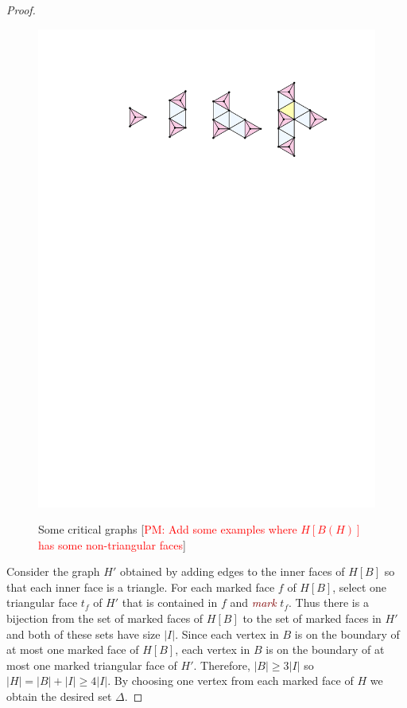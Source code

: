 \documentclass[12pt]{article}
\newcommand{\defin}[1]{\emph{\textcolor{Maroon}{#1}}}
\newcommand{\pat}[1]{[\textcolor{red}{PM: #1}]}
\begin{document}
\begin{proof}
    \begin{figure}
        \begin{center}
            \includegraphics[page=1]{figs/critical} \\
        \end{center}
        \caption{Some critical graphs \pat{Add some examples where $H[B(H)]$ has some non-triangular faces}}
        \label{critical_fig}
    \end{figure}

  Consider the graph $H'$ obtained by adding edges to the inner faces of $H[B]$ so that each inner face is a triangle. For each marked face $f$ of $H[B]$, select one triangular face $t_f$ of $H'$ that is contained in $f$ and \defin{mark} $t_f$. Thus there is a bijection from the set of marked faces of $H[B]$ to the set of marked faces in $H'$ and both of these sets have size $|I|$.  Since each vertex in $B$ is on the boundary of at most one marked face of $H[B]$, each vertex in $B$ is on the boundary of at most one marked triangular face of $H'$.  Therefore, $|B| \ge 3|I|$ so $|H|=|B|+|I|\ge 4|I|$. By choosing one vertex from each marked face of $H$ we obtain the desired set $\Delta$.
\end{proof}
\end{document}
